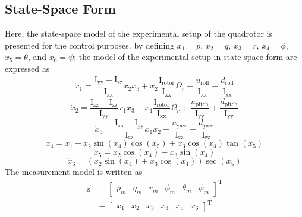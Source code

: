 \documentclass[conference]{IEEEtran}
\begin{document}
\subsection{State-Space Form}
\noindent Here, the state-space model of the experimental setup of the quadrotor is presented for the control purposes. by defining $x_1 = p$, $x_2 = q$, $x_3 = r$, $x_4 = \phi$, $x_5 = \theta$, and $x_6 = \psi$; the model of the experimental setup in state-space form are expressed as
\begin{equation}\label{eq:diffeq}
	\begin{split}
		\dot x_1 = \dfrac{\mathrm{I}_{\text{yy}} - \mathrm{I}_{\text{zz}}}{\mathrm{I}_{\text{xx}}} x_2 x_3 + x_2 \dfrac{\mathrm{I}_{\text{rotor}}}{\mathrm{I}_{\text{xx}}}\Omega_r + \dfrac{u_{\text{roll}}}{\mathrm{I}_{\text{xx}}} + \dfrac{d_{\text{roll}}}{\mathrm{I}_{\text{xx}}} 
	\end{split}
\end{equation}
\begin{equation}
	\dot x_2 = \dfrac{\mathrm{I}_{\text{zz}} - \mathrm{I}_{\text{zz}}}{\mathrm{I}_{\text{yy}}} x_1 x_3 - x_1 \dfrac{\mathrm{I}_{\text{rotor}}}{\mathrm{I}_{\text{xx}}}\Omega_r + \dfrac{u_{\text{pitch}}}{\mathrm{I}_{\text{yy}}} + \dfrac{d_{\text{pitch}}}{\mathrm{I}_{\text{yy}}}
\end{equation}
\begin{equation}
	\dot x_3 = \dfrac{\mathrm{I}_{\text{xx}} - \mathrm{I}_{\text{yy}}}{\mathrm{I}_{\text{zz}}} x_1 x_2 + \dfrac{u_{\text{yaw}}}{\mathrm{I}_{\text{zz}}} + \dfrac{d_{\text{yaw}}}{\mathrm{I}_{\text{zz}}}
\end{equation}
\begin{equation}
	\dot x_4 = x_1 + x_2\sin(x_4)\cos(x_5) + x_3\cos(x_4)\tan(x_5)
\end{equation}
\begin{equation}
	\dot x_5 = x_2\cos(x_4) - x_3\sin(x_4)
\end{equation}
\begin{equation}\label{eq:diffeq-end}
	\dot x_6 = (x_2\sin(x_4) + x_3\cos(x_4))\sec(x_5)
\end{equation}
The measurement model is written as
\begin{equation}
	\begin{split}
		\boldsymbol{\mathrm{z}} &= \begin{bmatrix}
			p_m & q_m & r_m & \phi_m & \theta_m & \psi_m
		\end{bmatrix}^\mathrm{T}
		\\
		& = \begin{bmatrix}
			x_1 & x_2 & x_3 & x_4 & x_5 & x_6
		\end{bmatrix}^\mathrm{T}
	\end{split}
\end{equation}
\end{document}
